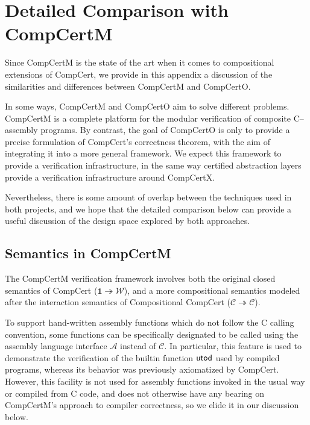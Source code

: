 \documentclass[sigplan,screen]{acmart}
\newcommand{\opt}[2]{#1}
\newenvironment{optional}{}{}
\newcommand{\opt}[2]{#2}
\begin{document}
\opt{}{\balance}



\begin{optional}

\newpage
\appendix

\section{Detailed Comparison with CompCertM} %

Since CompCertM is the state of the art
when it comes to compositional extensions of CompCert,
we provide in this appendix a discussion of
the similarities and differences
between CompCertM and CompCertO.

In some ways,
CompCertM and CompCertO aim to solve different problems.
CompCertM is a complete platform
for the modular verification of composite C--assembly programs.
By contrast,
the goal of CompCertO is only to
provide a precise formulation of CompCert's correctness theorem,
with the aim of integrating it into
a more general framework.
We expect this framework to provide a verification infrastructure,
in the same way certified abstraction layers
provide a verification infrastructure around CompCertX.

Nevertheless,
there is some amount of overlap between
the techniques used in both projects,
and we hope that the detailed comparison below
can provide a useful discussion
of the design space explored by both approaches.

\subsection{Semantics in CompCertM} %

The CompCertM verification framework involves
both the original closed semantics of CompCert
($\mathbf{1} \twoheadrightarrow \mathcal{W}$),
and a more compositional semantics
modeled after the interaction semantics of Compositional CompCert
($\mathcal{C} \twoheadrightarrow \mathcal{C}$).

To support hand-written assembly functions
which do not follow the C calling convention,
some functions can be specifically designated
to be called
using the assembly language interface $\mathcal{A}$
instead of $\mathcal{C}$.
In particular,
this feature is used to demonstrate
the verification of the builtin function $ \mathsf{utod} $
used by compiled programs,
whereas its behavior was previously
axiomatized by CompCert.
However,
this facility is not used for assembly functions
invoked in the usual way or compiled from C code,
and does not otherwise have any bearing on
CompCertM's approach to compiler correctness,
so we elide it in our discussion below.


\end{optional}
\end{document}
